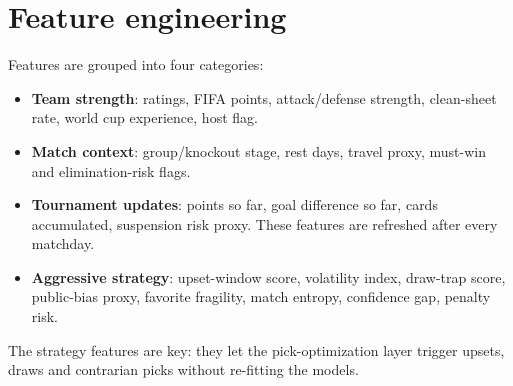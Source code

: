\section{Feature engineering}
Features are grouped into four categories:
\begin{itemize}
  \item \textbf{Team strength}: ratings, FIFA points, attack/defense strength,
        clean-sheet rate, world cup experience, host flag.
  \item \textbf{Match context}: group/knockout stage, rest days, travel proxy,
        must-win and elimination-risk flags.
  \item \textbf{Tournament updates}: points so far, goal difference so far,
        cards accumulated, suspension risk proxy. These features are refreshed
        after every matchday.
  \item \textbf{Aggressive strategy}: upset-window score, volatility index,
        draw-trap score, public-bias proxy, favorite fragility, match entropy,
        confidence gap, penalty risk.
\end{itemize}
The strategy features are key: they let the pick-optimization layer trigger
upsets, draws and contrarian picks without re-fitting the models.
